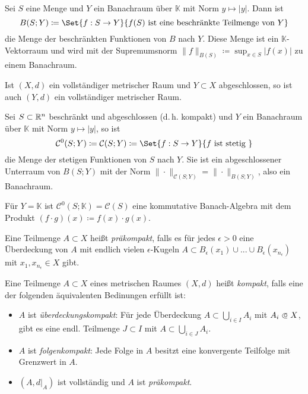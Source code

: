 \documentclass{cheat-sheet}
\newcommand{\K}{\mathbb{K}}
\begin{document}
\begin{defn}
  Sei $S$ eine Menge und $Y$ ein Banachraum über $\K$ mit Norm $y \mapsto |y|$. Dann ist
  \[ B(S; Y) \coloneqq \Set{ f : S \to Y }{ f(S) \text { ist eine beschränkte Teilmenge von } Y } \]
  die Menge der beschränkten Funktionen von $B$ nach $Y$. Diese Menge ist ein $\K$-Vektorraum und wird mit der Supremumsnorm $\| f \|_{B(S)} \coloneqq \sup_{x \in S} |f(x)|$ zu einem Banachraum.
\end{defn}

\begin{satz}
  Ist $(X, d)$ ein vollständiger metrischer Raum und $Y \subset X$ abgeschlossen, so ist auch $(Y, d)$ ein vollständiger metrischer Raum.
\end{satz}

\begin{defn}
  Sei $S \subset \mathbb{R}^n$ beschränkt und abgeschlossen (d.\,h. kompakt) und $Y$ ein Banachraum über $\K$ mit Norm $y \mapsto |y|$, so ist
  \[ \mathcal{C}^0(S; Y) \coloneqq \mathcal{C}(S; Y) \coloneqq \Set{ f : S \to Y }{ f \text{ ist stetig } } \]
  die Menge der stetigen Funktionen von $S$ nach $Y$. Sie ist ein abgeschlossener Unterraum von $B(S; Y)$ mit der Norm $\| \cdot \|_{\mathcal{C}(S; Y)} = \| \cdot \|_{B(S; Y)}$, also ein Banachraum.
\end{defn}

\begin{bem}
  Für $Y = \K$ ist $\mathcal{C}^0(S; \K) = \mathcal{C}(S)$ eine kommutative Banach-Algebra mit dem Produkt $(f \cdot g)(x) \coloneqq f(x) \cdot g(x)$.
\end{bem}

\begin{defn}
  Eine Teilmenge $A \subset X$ heißt \emph{präkompakt}, falls es für jedes $\epsilon > 0$ eine Überdeckung von $A$ mit endlich vielen $\epsilon$-Kugeln $A \subset B_{\epsilon}(x_1) \cup ... \cup B_{\epsilon}(x_{n_\epsilon})$ mit $x_1, x_{n_\epsilon} \in X$ gibt.
\end{defn}

\begin{defn}
  Eine Teilmenge $A \subset X$ eines metrischen Raumes $(X, d)$ heißt \emph{kompakt}, falls eine der folgenden äquivalenten Bedinungen erfüllt ist:
  \begin{itemize}
    \item $A$ ist \emph{überdeckungskompakt}: Für jede Überdeckung $A \subset \bigcup_{i \in I} A_i$ mit $A_i \opn X$,  gibt es eine endl. Teilmenge $J \subset I$ mit $A \subset \bigcup_{i \in J} A_i$.
    \item $A$ ist \emph{folgenkompakt}: Jede Folge in $A$ besitzt eine konvergente Teilfolge mit Grenzwert in $A$.
    \item $(A, d|_A)$ ist vollständig und $A$ ist \emph{präkompakt}.
  \end{itemize}
\end{defn}
\end{document}
